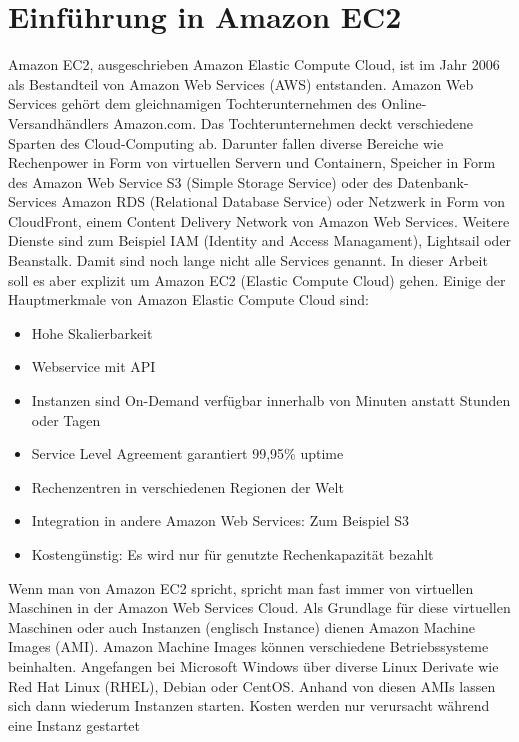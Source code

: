 \documentclass[titlepage]{report}
\begin{document}
\section*{Einführung in Amazon EC2}
Amazon EC2, ausgeschrieben Amazon Elastic Compute Cloud, ist im Jahr
2006 als Bestandteil von Amazon Web Services (AWS)
entstanden.\cite{aws} Amazon Web Services gehört dem gleichnamigen
Tochterunternehmen des Online\hyp{}Versandhändlers Amazon.com.\cite{Fou}
Das Tochterunternehmen deckt verschiedene Sparten des Cloud\hyp{}Computing
ab. Darunter fallen diverse Bereiche wie Rechenpower in Form von
virtuellen Servern und Containern, Speicher in Form des Amazon Web
Service S3 (Simple Storage Service) oder des Datenbank\hyp{}Services Amazon
RDS (Relational Database Service) oder Netzwerk in Form von CloudFront,
einem Content Delivery Network von Amazon Web Services. Weitere Dienste
sind zum Beispiel IAM (Identity and Access Managament), Lightsail oder Beanstalk.
Damit sind noch lange nicht alle Services genannt. In dieser Arbeit soll
es aber explizit um Amazon EC2 (Elastic Compute Cloud) gehen. Einige der
Hauptmerkmale von Amazon Elastic Compute Cloud sind:
\begin{itemize}
    \item Hohe Skalierbarkeit
    \item Webservice mit API
    \item Instanzen sind On\hyp{}Demand verfügbar innerhalb von Minuten anstatt
      Stunden oder Tagen
    \item Service Level Agreement garantiert 99,95\% uptime\cite{ec2}
    \item Rechenzentren in verschiedenen Regionen der Welt
    \item Integration in andere Amazon Web Services: Zum Beispiel S3
    \item Kostengünstig: Es wird nur für genutzte Rechenkapazität bezahlt
\end{itemize}
Wenn man von Amazon EC2 spricht, spricht man fast immer von virtuellen
Maschinen in der Amazon Web Services Cloud. Als Grundlage für diese
virtuellen Maschinen oder auch Instanzen (englisch Instance) dienen
Amazon Machine Images (AMI).\cite{ec2details} Amazon Machine Images
können verschiedene Betriebssysteme beinhalten. Angefangen bei Microsoft
Windows über diverse Linux Derivate wie Red Hat Linux (RHEL), Debian
oder CentOS. Anhand von diesen AMIs lassen sich dann wiederum Instanzen
starten. Kosten werden nur verursacht während eine Instanz gestartet
\end{document}
